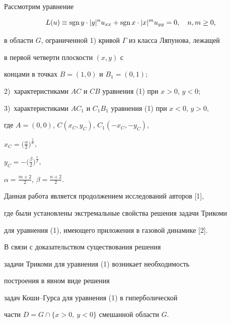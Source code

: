 \maketitle


\label{begin}








Рассмотрим уравнение 


\begin{equation}


L(u)\equiv \sgn y\cdot|y|^n u_{xx} + \sgn x\cdot|x|^m u_{yy} = 0,


\quad n,m\ge 0,


\end{equation}


в области $G$, ограниченной 1) кривой $\Gamma$ из класса Ляпунова, лежащей 


в первой четверти плоскости $(x,y)$ с 


концами в точках $B=(1,0)$ и $B_1=(0,1);$ 


2)~характеристиками $AC$ и $CB$ уравнения (1) при $x>0$, $y<0$; 


3)~характеристиками $AC_1$ и $C_1B_1$ уравнения (1) при $x<0$, $y>0$, 


где $A=(0,0)$, $C(x_C, y_C)$, $C_1(-x_C,-y_C)$,  


$x_C=\big(\frac{\alpha}{2}\big)^{\frac{1}{\alpha}}$,


$y_C=-\big(\frac{\beta}{2}\big)^{\frac{1}{\beta}}$, 


$\alpha={\frac{m+2}{2}}$, $\beta={\frac{n+2}{2}}$.





Данная работа является продолжением исследований авторов [1], 


где были установлены экстремальные свойства  решения задачи Трикоми 


для уравнения (1), имеющего приложения в газовой динамике [2]. 


В связи с доказательством существования решения 


задачи Трикоми для уравнения (1) возникает необходимость 


построения в явном виде решения 


задач Коши--Гурса для уравнения (1) в гиперболической 


части $D=G\cap \{x>0,\ y<0\}$ смешанной области $G$.


\medskip





